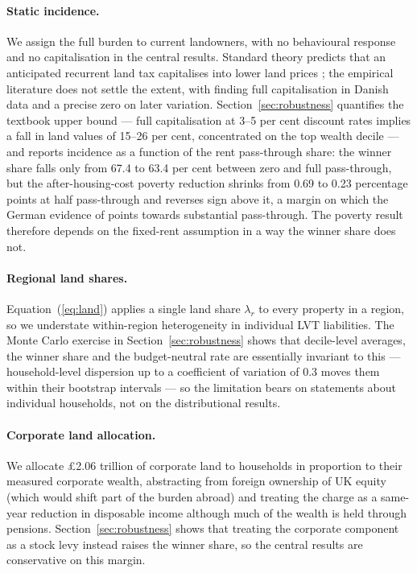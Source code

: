 \paragraph{Static incidence.} We assign the full burden to current landowners, with no behavioural response and no capitalisation in the central results. Standard theory predicts that an anticipated recurrent land tax capitalises into lower land prices \citep{feldstein1977}; the empirical literature does not settle the extent, with \citet{hoj2018} finding full capitalisation in Danish data and \citet{nielsson2024} a precise zero on later variation. Section~\ref{sec:robustness} quantifies the textbook upper bound --- full capitalisation at 3--5 per cent discount rates implies a fall in land values of 15--26 per cent, concentrated on the top wealth decile --- and reports incidence as a function of the rent pass-through share: the winner share falls only from 67.4 to 63.4 per cent between zero and full pass-through, but the after-housing-cost poverty reduction shrinks from 0.69 to 0.23 percentage points at half pass-through and reverses sign above it, a margin on which the German evidence of \citet{loeffler2024} points towards substantial pass-through. The poverty result therefore depends on the fixed-rent assumption in a way the winner share does not.

\paragraph{Regional land shares.} Equation~(\ref{eq:land}) applies a single land share $\lambda_r$ to every property in a region, so we understate within-region heterogeneity in individual LVT liabilities. The Monte Carlo exercise in Section~\ref{sec:robustness} shows that decile-level averages, the winner share and the budget-neutral rate are essentially invariant to this --- household-level dispersion up to a coefficient of variation of 0.3 moves them within their bootstrap intervals --- so the limitation bears on statements about individual households, not on the distributional results.

\paragraph{Corporate land allocation.} We allocate \pounds 2.06 trillion of corporate land to households in proportion to their measured corporate wealth, abstracting from foreign ownership of UK equity (which would shift part of the burden abroad) and treating the charge as a same-year reduction in disposable income although much of the wealth is held through pensions. Section~\ref{sec:robustness} shows that treating the corporate component as a stock levy instead raises the winner share, so the central results are conservative on this margin.

